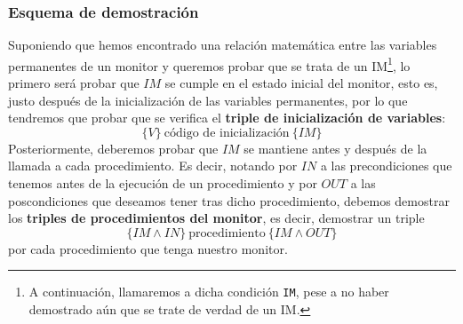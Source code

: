 \subsubsection{Esquema de demostración}
Suponiendo que hemos encontrado una relación matemática entre las variables permanentes de un monitor y queremos probar que se trata de un IM\footnote{A continuación, llamaremos a dicha condición \texttt{IM}, pese a no haber demostrado aún que se trate de verdad de un IM.}, lo primero será probar que $IM$ se cumple en el estado inicial del monitor, esto es, justo después de la inicialización de las variables permanentes, por lo que tendremos que probar que se verifica el \textbf{triple de inicialización de variables}:
\begin{equation*}
    \{V\}\ \text{código de inicialización}\ \{IM\}
\end{equation*}
Posteriormente, deberemos probar que $IM$ se mantiene antes y después de la llamada a cada procedimiento. Es decir, notando por $IN$ a las precondiciones que tenemos antes de la ejecución de un procedimiento y por $OUT$ a las poscondiciones que deseamos tener tras dicho procedimiento, debemos demostrar los \textbf{triples de procedimientos del monitor}, es decir, demostrar un triple
\begin{equation*}
    \{IM \land IN\}\ \text{procedimiento}\ \{IM \land OUT\}
\end{equation*}
por cada procedimiento que tenga nuestro monitor.

